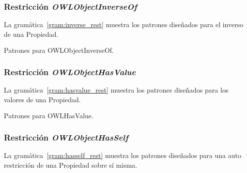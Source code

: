 \subsubsection{Restricción \emph{OWLObjectInverseOf}}
La gramática~\ref{gram:inverse_rest} muestra los patrones diseñados para el inverso de una Propiedad.

\begin{GrammarEnv}
\begin{grammar}
\end{grammar}
\caption{Patrones para OWLObjectInverseOf.}\label{gram:inverse_rest}
\end{GrammarEnv}

\subsubsection{Restricción \emph{OWLObjectHasValue}}
La gramática~\ref{gram:hasvalue_rest} muestra los patrones diseñados para los valores de una Propiedad.

\begin{GrammarEnv}
\begin{grammar}
\end{grammar}
\caption{Patrones para OWLHasValue.}\label{gram:hasvalue_rest}
\end{GrammarEnv}

\subsubsection{Restricción \emph{OWLObjectHasSelf}}
La gramática~\ref{gram:hasself_rest} muestra los patrones diseñados para una auto restricción de una Propiedad sobre sí misma.

